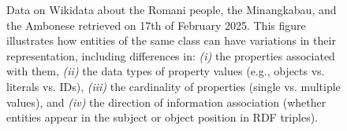 




\begin{figure}[!htbp]
    \centering
    \caption{Data on Wikidata about the Romani people, the Minangkabau, and the Ambonese retrieved on 17th of February 2025. This figure illustrates how entities of the same class can have variations in their representation, including differences in: \textit{(i)} the properties associated with them, \textit{(ii)} the data types of property values (e.g., objects vs. literals vs. IDs), \textit{(iii)} the cardinality of properties (single vs. multiple values), and \textit{(iv)} the direction of information association (whether entities appear in the subject or object position in RDF triples).} \label{fig:intro-wikidata}
\end{figure}

